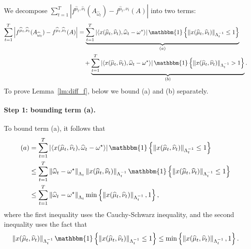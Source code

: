 We decompose $\sum_{t=1}^T \left| f^{\widehat{\mu}_t,\widehat{\nu}_t}(A_{\widehat{\omega}_t}) - f^{\widehat{\mu}_t,\widehat{\nu}_t}(A)\right|$ into two terms:
\begin{align}\label{eq:dec}
    \sum_{t=1}^T \left| f^{\widehat{\mu}_t,\widehat{\nu}_t}(A_{\widehat{\omega}_t}) - f^{\widehat{\mu}_t,\widehat{\nu}_t}(A)\right|&= \underbrace{\sum_{t=1}^T \left| \langle x(\widehat{\mu}_t,\widehat{\nu}_t),\widehat{\omega}_t-\omega^\star\rangle\right|\mathbbm{1}\left\{\norm{x(\widehat{\mu}_t,\widehat{\nu}_t)}_{\Lambda_{t}^{-1}}\leq 1\right\}}_{(a)}\notag\\
    & \quad + \underbrace{\sum_{t=1}^T \left| \langle x(\widehat{\mu}_t,\widehat{\nu}_t),\widehat{\omega}_t-\omega^\star\rangle\right|\mathbbm{1}\left\{\norm{x(\widehat{\mu}_t,\widehat{\nu}_t)}_{\Lambda_{t}^{-1}}> 1\right\}}_{(b)}.
\end{align}
To prove Lemma~\ref{lm:diff_f}, below we bound (a) and (b) separately.

\paragraph{Step 1: bounding term (a).} To bound term (a), it follows that
\begin{align}\label{eq:bound_i_1}
    (a) &= \sum_{t=1}^T \left| \langle x(\widehat{\mu}_t,\widehat{\nu}_t),\widehat{\omega}_t-\omega^\star\rangle\right|\mathbbm{1}\left\{\norm{x(\widehat{\mu}_t,\widehat{\nu}_t)}_{\Lambda_{t}^{-1}}\leq 1\right\}\notag\\
    &\leq \sum_{t=1}^T \norm{\widehat{\omega}_t-\omega^\star}_{\Lambda_t}\norm{x(\widehat{\mu}_t,\widehat{\nu}_t)}_{\Lambda_t^{-1}}\mathbbm{1}\left\{\norm{x(\widehat{\mu}_t,\widehat{\nu}_t)}_{\Lambda_{t}^{-1}}\leq 1\right\}\notag\\
    &\leq \sum_{t=1}^T \norm{\widehat{\omega}_t-\omega^\star}_{\Lambda_t}\min\left\{ \norm{x(\widehat{\mu}_t,\widehat{\nu}_t)}_{\Lambda_{t}^{-1}},1\right\},
\end{align}
where the first inequality uses the Cauchy-Schwarz inequality, and the second inequality uses the fact that
$$\norm{x(\widehat{\mu}_t,\widehat{\nu}_t)}_{\Lambda_t^{-1}}\mathbbm{1}\left\{\norm{x(\widehat{\mu}_t,\widehat{\nu}_t)}_{\Lambda_{t}^{-1}}\leq 1\right\}\leq \min\left\{ \norm{x(\widehat{\mu}_t,\widehat{\nu}_t)}_{\Lambda_{t}^{-1}},1\right\}.$$



